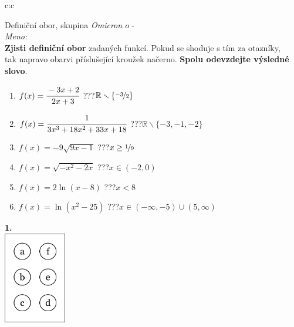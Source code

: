 \documentclass[10pt]{report}
\newcommand\omicron{o}
\begin{document}
\begin{tabular}{c:c}
\begin{minipage}[c][99mm][t]{0.49\linewidth}
\begin{center}
\vspace{7mm}
{\huge Definiční obor, skupina \textit{Omicron $\omicron$} -}\\[4.5mm]
\textit{Meno:}\phantom{xxxxxxxxxxxxxxxxxxxxxxxxxxxxxxxxxxxxxxxxxxxxxxxxxxxxxxxxxxxxxxxxx}\\[3.5mm]
\textbf{Zjisti definiční obor} zadaných funkcí. Pokud se shoduje s tím za otazníky,\\tak napravo obarvi příslušející kroužek načerno. \textbf{Spolu odevzdejte výsledné slovo}.\\[3mm]
\begin{minipage}{0.77\linewidth}
\begin{center}
\begin{varwidth}{\textwidth}
\begin{enumerate}
\normalsize
\item $f(x)=\cfrac{-3x+2}{2x+3}$\quad \dotfill\; ???\;\dotfill \quad $\mathbb{R}\smallsetminus\{\nicefrac{-3}{2}\}$
\item $f(x)=\cfrac{1}{3x^3+18x^2+33x+18}$\quad \dotfill\; ???\;\dotfill \quad $\mathbb{R}\smallsetminus\{-3,-1,-2\}$
\item $f(x)=-9\sqrt{9x-1}$\quad \dotfill\; ???\;\dotfill \quad $x\geq\nicefrac{1}{9}$
\item $f(x)=\sqrt{-x^2-2x}$\quad \dotfill\; ???\;\dotfill \quad $x\in(-2 , 0)$
\item $f(x)=2\ln{(x-8)}$\quad \dotfill\; ???\;\dotfill \quad $x<8$
\item $f(x)=\ln{(x^2-25)}$\quad \dotfill\; ???\;\dotfill \quad $x\in(-\infty , -5)\cup(5 , \infty)$
\end{enumerate}
\end{varwidth}
\end{center}
\end{minipage}
\begin{minipage}{0.20\linewidth}
\begin{center}
{\Huge\bfseries 1.} \\[2mm]
\includegraphics[height=40mm]{../images/braille.png}

\end{center}
\end{minipage}
\end{center}
\end{minipage}
\end{tabular}
\end{document}
